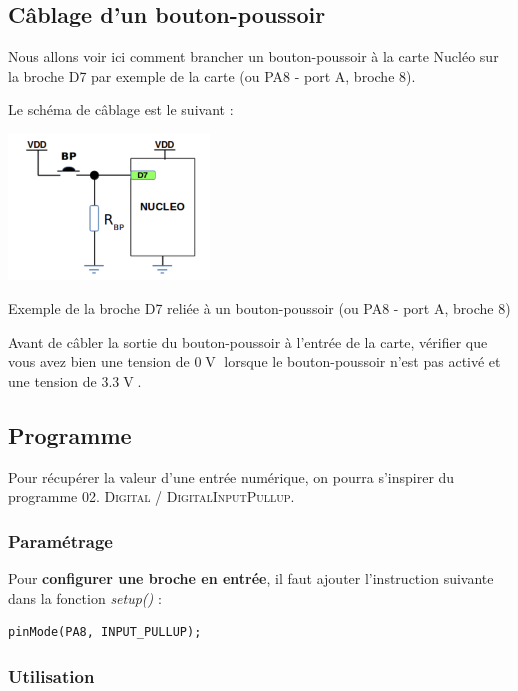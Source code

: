 \documentclass[a4paper,11pt,titlepage]{article} %
\begin{document}
\subsection{Câblage d'un bouton-poussoir}

Nous allons voir ici comment brancher un bouton-poussoir à la carte Nucléo sur la broche D7 par exemple de la carte (ou PA8 - port A, broche 8).

Le schéma de câblage est le suivant :

\begin{center}
	\includegraphics[width=0.4\textwidth]{images/MINE_Nucleo_BoutonPoussoir.png}
	
	Exemple de la broche D7 reliée à un bouton-poussoir (ou PA8 - port A, broche 8)
\end{center}

Avant de câbler la sortie du bouton-poussoir à l'entrée de la carte, vérifier que vous avez bien une tension de $0\operatorname{V}$ lorsque le bouton-poussoir n'est pas activé et une tension de $3.3\operatorname{V}$.

\subsection{Programme}

Pour récupérer la valeur d'une entrée numérique, on pourra s'inspirer du programme \textsc{02. Digital / DigitalInputPullup}.

\subsubsection{Paramétrage}

Pour \textbf{configurer une broche en entrée}, il faut ajouter l'instruction suivante dans la fonction \textsl{setup()} :

\begin{lstlisting}
pinMode(PA8, INPUT_PULLUP);
\end{lstlisting}

\subsubsection{Utilisation}
\end{document}
